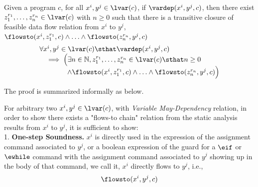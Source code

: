 \begin{thm}
\label{thm:flowsto_soundness}
Given a program ${c}$, for all  $ x^i, y^j \in \lvar(c)$, if $\vardep(x^i, y^j, {c})$,
then
there exist $z_1^{r_1}, \ldots, z_n^{r_n} \in \lvar(c)$ with $n \geq 0$ such that there is a
transitive closure of feasible data flow relation from $x^i$ to $y^j$,  
$\flowsto(x^i,  z_1^{r_1}, c) 
\land \ldots \land \flowsto(z_n^{r_n}, y^j, c)$
%
\[
\begin{array}{l}
  \forall x^i, y^j \in \lvar(c) \sthat
  \vardep(x^i, y^j, {c})
  \\ \quad \implies
  \Big( \exists n \in \mathbb{N}, z_1^{r_1}, \ldots, z_n^{r_n} \in \lvar(c) \sthat  n \geq 0 
  \\ \qquad \qquad \land
  \flowsto(x^i,  z_1^{r_1}, c) 
  \land \ldots \land \flowsto(z_n^{r_n}, y^j, c) \Big)
\end{array}
\]
\end{thm}
The proof is summarized informally as below.

For  arbitrary two $x^i, y^j \in \lvar(c)$, with \emph{Variable May-Dependency} relation, in order to show there exists a 
"flows-to chain" relation from the static analysis results from $x^i$ to $y^j$, it is sufficient to show:
  \\
  1. \textbf{One-step Soundness.} $x^i$ is directly used in the expression of the assignment command associated to $y^j$, or a boolean
  expression of the guard for a $\eif$ or $\ewhile$ command with the assignment command associated to $y^j$ showing up in the body of that command, 
  we call it, $x^i$ directly flows to $y^j$,
  i.e.,
  \[\flowsto(x^i, y^j, {c})\]


